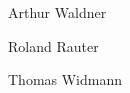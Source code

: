 \begin{center}
\vspace{0.3cm}

\begin{minipage}[t]{0.3\textwidth}
    Arthur Waldner
\end{minipage}
\begin{minipage}[t]{0.3\textwidth}
    Roland Rauter
\end{minipage}
\begin{minipage}[t]{0.3\textwidth}
    Thomas Widmann
\end{minipage}

\end{center}